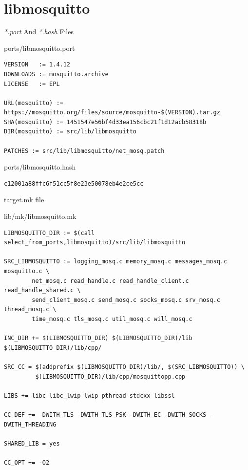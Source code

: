 \documentclass{beamer}
\begin{document}
  \section{libmosquitto}

  \begin{frame}[fragile]{\textit{*.port} And \textit{*.hash} Files}
    \begin{block}{ports/libmosquitto.port}
      \begin{verbatim}
VERSION   := 1.4.12
DOWNLOADS := mosquitto.archive
LICENSE   := EPL

URL(mosquitto) := https://mosquitto.org/files/source/mosquitto-$(VERSION).tar.gz
SHA(mosquitto) := 1451547e56bf4d33ea156cbc21f1d12acb58318b
DIR(mosquitto) := src/lib/libmosquitto

PATCHES := src/lib/libmosquitto/net_mosq.patch
      \end{verbatim}
    \end{block}

    \begin{block}{ports/libmosquitto.hash}
      \begin{verbatim}
c12001a88ffc6f51cc5f8e23e50078eb4e2ce5cc
      \end{verbatim}
    \end{block}
  \end{frame}

  \begin{frame}[fragile]{target.mk file}
    \begin{block}{lib/mk/libmosquitto.mk}
      \begin{verbatim}
LIBMOSQUITTO_DIR := $(call select_from_ports,libmosquitto)/src/lib/libmosquitto

SRC_LIBMOSQUITTO := logging_mosq.c memory_mosq.c messages_mosq.c mosquitto.c \
        net_mosq.c read_handle.c read_handle_client.c read_handle_shared.c \
        send_client_mosq.c send_mosq.c socks_mosq.c srv_mosq.c thread_mosq.c \
        time_mosq.c tls_mosq.c util_mosq.c will_mosq.c

INC_DIR += $(LIBMOSQUITTO_DIR) $(LIBMOSQUITTO_DIR)/lib $(LIBMOSQUITTO_DIR)/lib/cpp/

SRC_CC = $(addprefix $(LIBMOSQUITTO_DIR)/lib/, $(SRC_LIBMOSQUITTO)) \
         $(LIBMOSQUITTO_DIR)/lib/cpp/mosquittopp.cpp

LIBS += libc libc_lwip lwip pthread stdcxx libssl

CC_DEF += -DWITH_TLS -DWITH_TLS_PSK -DWITH_EC -DWITH_SOCKS -DWITH_THREADING

SHARED_LIB = yes

CC_OPT += -O2
      \end{verbatim}
    \end{block}
  \end{frame}
\end{document}
